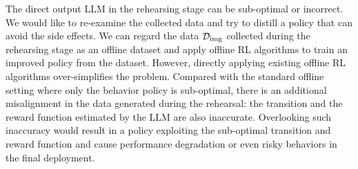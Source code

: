 The direct output LLM in the rehearsing stage can be sub-optimal or incorrect. We would like to re-examine the collected data and try to distill a policy that can avoid the side effects. 
We can regard the data $\mathcal{D}_{\rm img}$ collected during the rehearsing stage as an offline dataset and apply offline RL algorithms to train an improved policy from the dataset. 
However, directly applying existing offline RL algorithms over-simplifies the problem. Compared with the standard offline setting where only the behavior policy is sub-optimal, there is an additional misalignment in the data generated during the rehearsal: the transition and the reward function estimated by the LLM are also inaccurate. Overlooking such inaccuracy would result in a policy exploiting the sub-optimal transition and reward function and cause performance degradation or even risky behaviors in the final deployment. 

